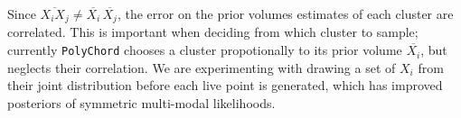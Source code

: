 \documentclass[25pt, a0paper, portrait]{tikzposter}
\newcommand{\polychord}{\texttt{PolyChord}}
\begin{document}
\begin{columns}
{\begin{minipage}{0.22\textwidth}
        \end{minipage}\hfill
        \begin{minipage}{0.22\textwidth}
        \end{minipage}

        Since $\overline{X_iX_j} \neq \overline{X_i}\,\overline{X_j}$, the error on the prior volumes estimates of each cluster are correlated. This is important when deciding from which cluster to sample; currently \polychord{} chooses a cluster propotionally to its prior volume $\overline{X_i}$, but neglects their correlation. We are experimenting with drawing a set of $X_i$ from their joint distribution before each live point is generated, which has improved posteriors of symmetric multi-modal likelihoods.\\

    }
    
    \renewcommand{\section}[2]{}%

\end{columns}
\end{document}
